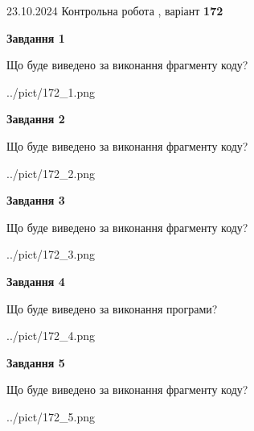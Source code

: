 \documentclass[12pt, ukrainian]{article}
\begin{document}
{\Large{23.10.2024 Контрольна робота , варіант  \No \textbf { 172 }\par}}
{
\begin {large}
{\begin {center}\textbf{Завдання 1}\end {center}}

Що буде виведено за виконання фрагменту коду?\par
\begin{center}
	{../pict/172_1.png}
\end{center}
\newpage

{\begin {center}\textbf{Завдання 2}\end {center}}

Що буде виведено за виконання фрагменту коду?\par
\begin{center}
	{../pict/172_2.png}
\end{center}
\newpage

{\begin {center}\textbf{Завдання 3}\end {center}}

Що буде виведено за виконання фрагменту коду?\par
\begin{center}
	{../pict/172_3.png}
\end{center}
\newpage

{\begin {center}\textbf{Завдання 4}\end {center}}

Що буде виведено за виконання програми?\par
\begin{center}
	{../pict/172_4.png}
\end{center}
\newpage

{\begin {center}\textbf{Завдання 5}\end {center}}

Що буде виведено за виконання фрагменту коду?\par
\begin{center}
	{../pict/172_5.png}
\end{center}
\newpage


\end{large}}
\end{document}
